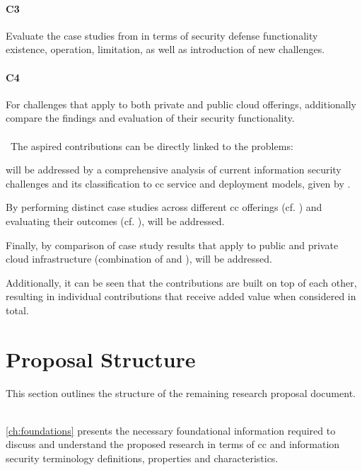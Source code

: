 	\paragraph{C3}\label{c3} Evaluate the case studies from  in terms of security defense functionality existence, operation, limitation, as well as introduction of new challenges.
	
	\paragraph{C4}\label{c4} For challenges that apply to both private and public cloud offerings, additionally compare the findings and evaluation of their security functionality.
	\\\ \\\
	The aspired contributions can be directly linked to the problems:
	
	 will be addressed by a comprehensive analysis of current information security challenges and its classification to \ac{cc} service and deployment models, given by .
	
	By performing distinct case studies across different \ac{cc} offerings (cf. ) and evaluating their outcomes (cf. ),  will be addressed.
	
	Finally, by comparison of case study results that apply to public and private cloud infrastructure (combination of  and ),  will be addressed.
	
	Additionally, it can be seen that the contributions are built on top of each other, resulting in individual contributions that receive added value when considered in total.
	

	\section{Proposal Structure} \label{sec:intro_structure}
	
	This section outlines the structure of the remaining research proposal document. \\\
	
	\autoref{ch:foundations} presents the necessary foundational information required to discuss and understand the proposed research in terms of \ac{cc} and information security terminology definitions, properties and characteristics.
	
